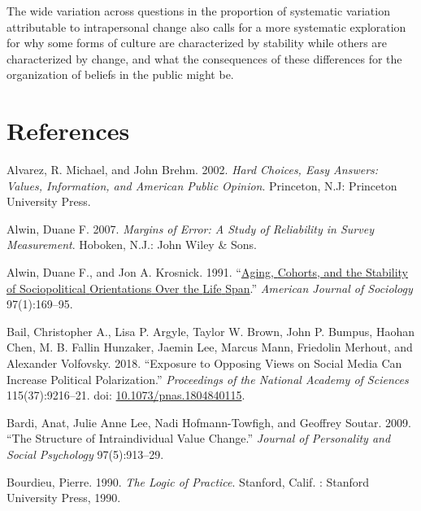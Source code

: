 \documentclass[
  12pt,
]{article}
\newlength{\cslhangindent}
\newlength{\cslentryspacingunit} %
\newenvironment{CSLReferences}[2] %
 {%
  \setlength{\parindent}{0pt}
  \ifodd #1
  \let\oldpar\par
  \def\par{\hangindent=\cslhangindent\oldpar}
  \fi
  \setlength{\parskip}{#2\cslentryspacingunit}
 }%
 {}
\begin{document}
The wide variation across questions in the proportion of systematic
variation attributable to intrapersonal change also calls for a more
systematic exploration for why some forms of culture are characterized
by stability while others are characterized by change, and what the
consequences of these differences for the organization of beliefs in the
public might be.

\theendnotes

\hypertarget{references}{%
\section{References}\label{references}}

\hypertarget{refs}{}
\begin{CSLReferences}{1}{0}
\leavevmode{}%
Alvarez, R. Michael, and John Brehm. 2002. \emph{Hard Choices, Easy
Answers: Values, Information, and {American} Public Opinion}. Princeton,
N.J: Princeton University Press.

\leavevmode{}%
Alwin, Duane F. 2007. \emph{Margins of {Error}: {A} {Study} of
{Reliability} in {Survey} {Measurement}}. Hoboken, N.J.: John Wiley \&
Sons.

\leavevmode{}%
Alwin, Duane F., and Jon A. Krosnick. 1991.
{``\href{https://www.jstor.org/stable/2781642}{Aging, {Cohorts}, and the
{Stability} of {Sociopolitical} {Orientations} {Over} the {Life}
{Span}}.''} \emph{American Journal of Sociology} 97(1):169--95.

\leavevmode{}%
Bail, Christopher A., Lisa P. Argyle, Taylor W. Brown, John P. Bumpus,
Haohan Chen, M. B. Fallin Hunzaker, Jaemin Lee, Marcus Mann, Friedolin
Merhout, and Alexander Volfovsky. 2018. {``Exposure to Opposing Views on
Social Media Can Increase Political Polarization.''} \emph{Proceedings
of the National Academy of Sciences} 115(37):9216--21. doi:
\href{https://doi.org/10.1073/pnas.1804840115}{10.1073/pnas.1804840115}.

\leavevmode{}%
Bardi, Anat, Julie Anne Lee, Nadi Hofmann-Towfigh, and Geoffrey Soutar.
2009. {``The Structure of Intraindividual Value Change.''} \emph{Journal
of Personality and Social Psychology} 97(5):913--29.

\leavevmode{}%
Bourdieu, Pierre. 1990. \emph{The Logic of Practice}. Stanford, Calif. :
Stanford University Press, 1990.


\end{CSLReferences}
\end{document}
